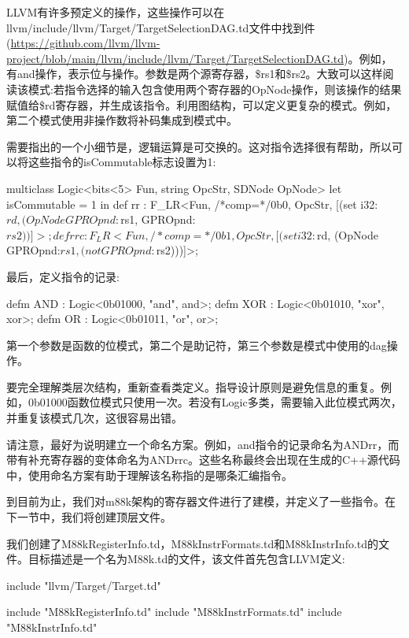 LLVM有许多预定义的操作，这些操作可以在llvm/include/llvm/Target/TargetSelectionDAG.td文件中找到件(\url{https://github.com/llvm/llvm-project/blob/main/llvm/include/llvm/Target/TargetSelectionDAG.td})。例如，有and操作，表示位与操作。参数是两个源寄存器，\$rs1和\$rs2。大致可以这样阅读该模式:若指令选择的输入包含使用两个寄存器的OpNode操作，则该操作的结果赋值给\$rd寄存器，并生成该指令。利用图结构，可以定义更复杂的模式。例如，第二个模式使用非操作数将补码集成到模式中。

需要指出的一个小细节是，逻辑运算是可交换的。这对指令选择很有帮助，所以可以将这些指令的isCommutable标志设置为1:

\begin{cpp}
multiclass Logic<bits<5> Fun, string OpcStr, SDNode OpNode> {
    let isCommutable = 1 in
    def rr : F_LR<Fun, /*comp=*/0b0, OpcStr,
                    [(set i32:$rd,
                    (OpNode GPROpnd:$rs1, GPROpnd:$rs2))]>;
    def rrc : F_LR<Fun, /*comp=*/0b1, OpcStr,
                    [(set i32:$rd,
                    (OpNode GPROpnd:$rs1, (not GPROpnd:$rs2)))]>;
}
\end{cpp}

最后，定义指令的记录:

\begin{cpp}
defm AND : Logic<0b01000, "and", and>;
defm XOR : Logic<0b01010, "xor", xor>;
defm OR : Logic<0b01011, "or", or>;
\end{cpp}

第一个参数是函数的位模式，第二个是助记符，第三个参数是模式中使用的dag操作。

要完全理解类层次结构，重新查看类定义。指导设计原则是避免信息的重复。例如，0b01000函数位模式只使用一次。若没有Logic多类，需要输入此位模式两次，并重复该模式几次，这很容易出错。

请注意，最好为说明建立一个命名方案。例如，and指令的记录命名为ANDrr，而带有补充寄存器的变体命名为ANDrrc。这些名称最终会出现在生成的C++源代码中，使用命名方案有助于理解该名称指的是哪条汇编指令。

到目前为止，我们对m88k架构的寄存器文件进行了建模，并定义了一些指令。在下一节中，我们将创建顶层文件。


我们创建了M88kRegisterInfo.td，M88kInstrFormats.td和M88kInstrInfo.td的文件。目标描述是一个名为M88k.td的文件，该文件首先包含LLVM定义:

\begin{cpp}
include "llvm/Target/Target.td"

include "M88kRegisterInfo.td"
include "M88kInstrFormats.td"
include "M88kInstrInfo.td"
\end{cpp}

